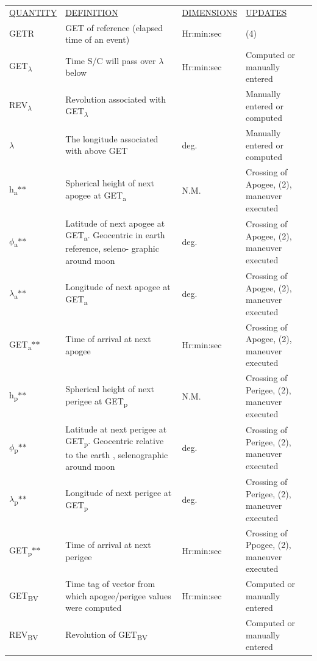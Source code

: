 \documentclass[11pt]{article} %
\begin{document}
\begin{center}
\begin{tabular}{ L{2.9cm} L{4.6cm} L{3cm} L{3.8cm} }
\underline{QUANTITY} & \underline{DEFINITION} & \underline{DIMENSIONS} & \underline{UPDATES} \\
GETR&GET of reference (elapsed time of an event)&Hr:min:sec&(4)\\
GET\textsubscript{$\lambda$}&Time S/C will pass over $\lambda$ below&Hr:min:sec&Computed or manually entered\\
REV\textsubscript{$\lambda$}&Revolution associated with GET\textsubscript{$\lambda$}&&Manually entered or computed\\
$\lambda$&The longitude associated with above GET&deg.&Manually entered or computed\\
h\textsubscript{a}$\ast$$\ast$&Spherical height of next apogee at GET\textsubscript{a}&N.M.&Crossing of Apogee, (2), maneuver executed\\
$\phi$\textsubscript{a}$\ast$$\ast$&Latitude of next apogee at GET\textsubscript{a}. Geocentric in earth reference, seleno- graphic around moon&deg.&Crossing of Apogee, (2), maneuver executed\\
$\lambda$\textsubscript{a}$\ast$$\ast$&Longitude of next apogee at GET\textsubscript{a}&deg.&Crossing of Apogee, (2), maneuver executed\\
GET\textsubscript{a}$\ast$$\ast$&Time of arrival at next apogee&Hr:min:sec&Crossing of Apogee, (2), maneuver executed\\
h\textsubscript{p}$\ast$$\ast$&Spherical height of next perigee at GET\textsubscript{p}&N.M.&Crossing of Perigee, (2), maneuver executed\\
$\phi$\textsubscript{p}$\ast$$\ast$&Latitude at next perigee at GET\textsubscript{p}. Geocentric relative to the earth , selenographic around moon&deg.&Crossing of Perigee, (2), maneuver executed\\
$\lambda$\textsubscript{p}$\ast$$\ast$&Longitude of next perigee at GET\textsubscript{p}&deg.&Crossing of Perigee, (2), maneuver executed\\
GET\textsubscript{p}$\ast$$\ast$&Time of arrival at next perigee&Hr:min:sec&Crossing of Ppogee, (2), maneuver executed\\
GET\textsubscript{BV}&Time tag of vector from which apogee/perigee values were computed&Hr:min:sec&Computed or manually entered\\
REV\textsubscript{BV}&Revolution of GET\textsubscript{BV}&&Computed or manually entered
\end{tabular}
\end{center}
\end{document}
